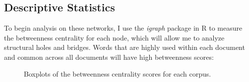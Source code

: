 \documentclass[12pt]{article}
\begin{document}
\subsection{Descriptive Statistics}

To begin analysis on these networks, I use the \textit{igraph} package in R to measure the betweenness centrality for each node, which will allow me to analyze structural holes and bridges. Words that are highly used within each document and common across all documents will have high betweenness scores: 
\vspace{2mm}
\begin{figure}[H]
	\hfill
	\hfill
	\hfill
	\caption{Boxplots of the betweenness centrality scores for each corpus.}
\end{figure}
\vspace{2mm}
\end{document}
